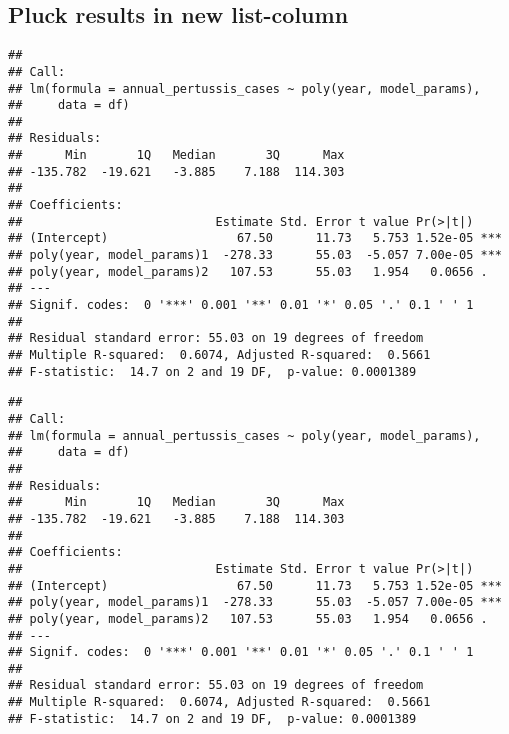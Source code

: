 \documentclass[]{article}
\newenvironment{Shaded}{\begin{snugshade}}{\end{snugshade}}
\newcommand{\KeywordTok}[1]{\textcolor[rgb]{0.13,0.29,0.53}{\textbf{#1}}}
\newcommand{\DataTypeTok}[1]{\textcolor[rgb]{0.13,0.29,0.53}{#1}}
\newcommand{\DecValTok}[1]{\textcolor[rgb]{0.00,0.00,0.81}{#1}}
\newcommand{\StringTok}[1]{\textcolor[rgb]{0.31,0.60,0.02}{#1}}
\newcommand{\OperatorTok}[1]{\textcolor[rgb]{0.81,0.36,0.00}{\textbf{#1}}}
\newcommand{\NormalTok}[1]{#1}
\begin{document}
\subsection{Pluck results in new
list-column}\label{pluck-results-in-new-list-column}

\begin{Shaded}
\end{Shaded}

\begin{verbatim}
## 
## Call:
## lm(formula = annual_pertussis_cases ~ poly(year, model_params), 
##     data = df)
## 
## Residuals:
##      Min       1Q   Median       3Q      Max 
## -135.782  -19.621   -3.885    7.188  114.303 
## 
## Coefficients:
##                           Estimate Std. Error t value Pr(>|t|)    
## (Intercept)                  67.50      11.73   5.753 1.52e-05 ***
## poly(year, model_params)1  -278.33      55.03  -5.057 7.00e-05 ***
## poly(year, model_params)2   107.53      55.03   1.954   0.0656 .  
## ---
## Signif. codes:  0 '***' 0.001 '**' 0.01 '*' 0.05 '.' 0.1 ' ' 1
## 
## Residual standard error: 55.03 on 19 degrees of freedom
## Multiple R-squared:  0.6074, Adjusted R-squared:  0.5661 
## F-statistic:  14.7 on 2 and 19 DF,  p-value: 0.0001389
\end{verbatim}

\begin{Shaded}
\end{Shaded}

\begin{verbatim}
## 
## Call:
## lm(formula = annual_pertussis_cases ~ poly(year, model_params), 
##     data = df)
## 
## Residuals:
##      Min       1Q   Median       3Q      Max 
## -135.782  -19.621   -3.885    7.188  114.303 
## 
## Coefficients:
##                           Estimate Std. Error t value Pr(>|t|)    
## (Intercept)                  67.50      11.73   5.753 1.52e-05 ***
## poly(year, model_params)1  -278.33      55.03  -5.057 7.00e-05 ***
## poly(year, model_params)2   107.53      55.03   1.954   0.0656 .  
## ---
## Signif. codes:  0 '***' 0.001 '**' 0.01 '*' 0.05 '.' 0.1 ' ' 1
## 
## Residual standard error: 55.03 on 19 degrees of freedom
## Multiple R-squared:  0.6074, Adjusted R-squared:  0.5661 
## F-statistic:  14.7 on 2 and 19 DF,  p-value: 0.0001389
\end{verbatim}
\end{document}
